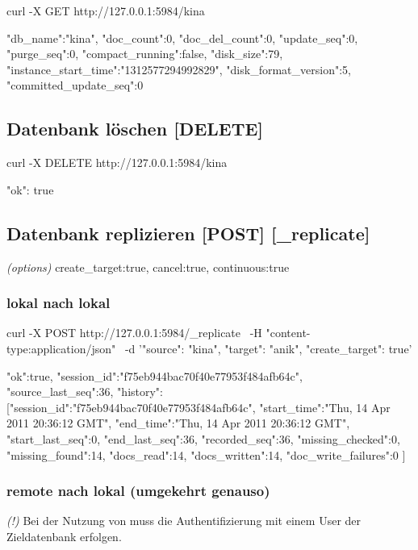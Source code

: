 \documentclass[19pt,landscape,twocolumn]{article}
\newcommand{\mono}[1]{\texttt{\textendash\textendash {#1}}}
\newcommand{\htmlverb}[1]{{[}\textbf{{#1}}{]}}
\newcommand{\setparskip}{\setlength{\parskip}{-6mm}}
\newcommand{\resetparskip}{\setlength{\parskip}{1mm}}
\begin{document}
\begin{code}
curl -X GET http://127.0.0.1:5984/kina
\end{code}
\setparskip
\begin{response}
{"db_name":"kina",
 "doc_count":0,
 "doc_del_count":0,
 "update_seq":0,
 "purge_seq":0,
 "compact_running":false,
 "disk_size":79,
 "instance_start_time":"1312577294992829",
 "disk_format_version":5,
 "committed_update_seq":0}
\end{response}
\resetparskip

\subsection{Datenbank löschen \htmlverb{DELETE}}

\begin{code}
curl -X DELETE http://127.0.0.1:5984/kina
\end{code}
\setparskip
\begin{response}
{"ok": true}
\end{response}
\resetparskip

\subsection{Datenbank replizieren \htmlverb{POST} \htmlverb{\_replicate}}
\emph{(options)} create\_target:true, cancel:true, continuous:true

\subsubsection{lokal nach lokal}
\begin{code}
curl -X POST http://127.0.0.1:5984/_replicate \
     -H "content-type:application/json" \
     -d '{"source": "kina",
          "target": "anik",
          "create_target": true}'
\end{code}
\setparskip
\begin{response}
{"ok":true, "session_id":"f75eb944bac70f40e77953f484afb64c",
 "source_last_seq":36, "history":
   [{"session_id":"f75eb944bac70f40e77953f484afb64c",
     "start_time":"Thu, 14 Apr 2011 20:36:12 GMT",
     "end_time":"Thu, 14 Apr 2011 20:36:12 GMT",
     "start_last_seq":0,
     "end_last_seq":36,
     "recorded_seq":36,
     "missing_checked":0,
     "missing_found":14,
     "docs_read":14,
     "docs_written":14,
     "doc_write_failures":0
  }]
}
\end{response}
\resetparskip

\subsubsection{remote nach lokal (umgekehrt genauso)}
\emph{(!)} Bei der Nutzung von \mono{create\_target} muss die Authentifizierung mit einem 
User der Zieldatenbank erfolgen.
\end{document}
